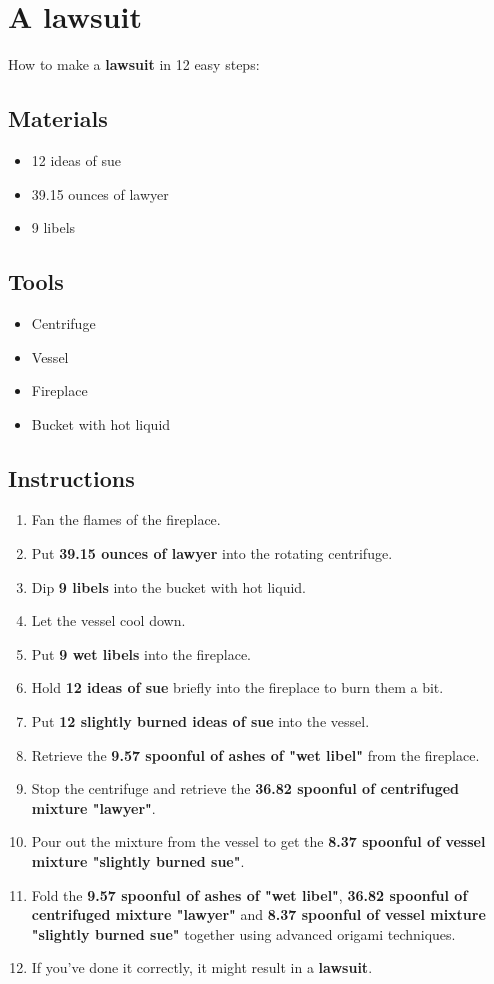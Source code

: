 \documentclass{article}
\begin{document}
\section{A lawsuit}How to make a \textbf{lawsuit} in 12 easy steps:

\subsection{Materials}\begin{itemize}
\item 
12 ideas of sue
\item 
39.15 ounces of lawyer
\item 
9 libels
\end{itemize}
\subsection{Tools}\begin{itemize}
\item 
Centrifuge
\item 
Vessel
\item 
Fireplace
\item 
Bucket with hot liquid
\end{itemize}
\subsection{Instructions}\begin{enumerate}
\item 
Fan the flames of the fireplace.
\item 
Put \textbf{39.15 ounces of lawyer} into the rotating centrifuge.
\item 
Dip \textbf{9 libels} into the bucket with hot liquid.
\item 
Let the vessel cool down.
\item 
Put \textbf{9 wet libels} into the fireplace.
\item 
Hold \textbf{12 ideas of sue} briefly into the fireplace to burn them a bit.
\item 
Put \textbf{12 slightly burned ideas of sue} into the vessel.
\item 
Retrieve the \textbf{9.57 spoonful of ashes of "wet libel"} from the fireplace.
\item 
Stop the centrifuge and retrieve the \textbf{36.82 spoonful of centrifuged mixture "lawyer"}.
\item 
Pour out the mixture from the vessel to get the \textbf{8.37 spoonful of vessel mixture "slightly burned sue"}.
\item 
Fold the \textbf{9.57 spoonful of ashes of "wet libel"}, \textbf{36.82 spoonful of centrifuged mixture "lawyer"} and \textbf{8.37 spoonful of vessel mixture "slightly burned sue"} together using advanced origami techniques.
\item 
If you've done it correctly, it might result in a \textbf{lawsuit}.
\end{enumerate}
\newpage
\end{document}
